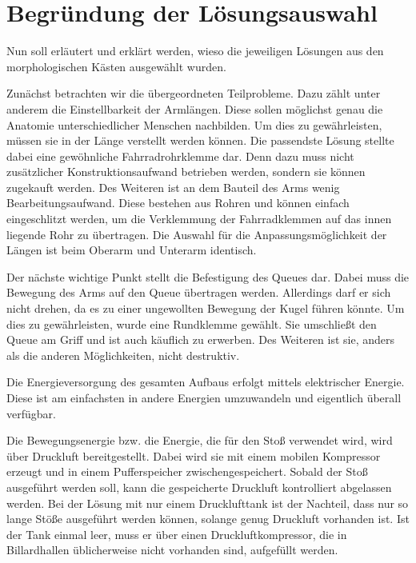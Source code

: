 \chapter{Begründung der Lösungsauswahl}\label{Begründung Loesungsauswahl}

	Nun soll erläutert und erklärt werden, wieso die jeweiligen Lösungen aus den morphologischen Kästen ausgewählt wurden. \par \medskip
	
	Zunächst betrachten wir die übergeordneten Teilprobleme. Dazu zählt unter anderem die Einstellbarkeit der Armlängen. Diese sollen möglichst genau die Anatomie unterschiedlicher Menschen nachbilden. Um dies zu gewährleisten, müssen sie in der Länge verstellt werden können. Die passendste Lösung stellte dabei eine gewöhnliche Fahrradrohrklemme dar. Denn dazu muss nicht zusätzlicher Konstruktionsaufwand betrieben werden, sondern sie können zugekauft werden. Des Weiteren ist an dem Bauteil des Arms wenig Bearbeitungsaufwand. Diese bestehen aus Rohren und können einfach eingeschlitzt werden, um die Verklemmung der Fahrradklemmen auf das innen liegende Rohr zu übertragen. Die Auswahl für die Anpassungsmöglichkeit der Längen ist beim Oberarm und Unterarm identisch. \par\medskip
	
	Der nächste wichtige Punkt stellt die Befestigung des Queues dar. Dabei muss die Bewegung des Arms auf den Queue übertragen werden. Allerdings darf er sich nicht drehen, da es zu einer ungewollten Bewegung der Kugel führen könnte. Um dies zu gewährleisten, wurde eine Rundklemme gewählt. Sie umschließt den Queue am Griff und ist auch käuflich zu erwerben. Des Weiteren ist sie, anders als die anderen Möglichkeiten, nicht destruktiv. \par\medskip
	
	Die Energieversorgung des gesamten Aufbaus erfolgt mittels elektrischer Energie. Diese ist am einfachsten in andere Energien umzuwandeln und eigentlich überall verfügbar. \par\medskip
	
	Die Bewegungsenergie bzw. die Energie, die für den Stoß verwendet wird, wird über Druckluft bereitgestellt. Dabei wird sie mit einem mobilen Kompressor erzeugt und in einem Pufferspeicher zwischengespeichert. Sobald der Stoß ausgeführt werden soll, kann die gespeicherte Druckluft kontrolliert abgelassen werden. Bei der Lösung mit nur einem Drucklufttank ist der Nachteil, dass nur so lange Stöße ausgeführt werden können, solange genug Druckluft vorhanden ist. Ist der Tank einmal leer, muss er über einen Druckluftkompressor, die in Billardhallen üblicherweise nicht vorhanden sind, aufgefüllt werden. \par\medskip
	
